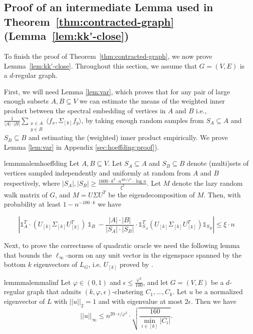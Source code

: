 \documentclass[letterpaper,11pt]{article}
\newcommand{\inner}[2]{\langle #1, #2 \rangle}
\theoremstyle{plain}
\theoremstyle{definition}
\theoremstyle{remark}
\newcommand{\e}{\epsilon}
\begin{document}
\subsection{Proof of an intermediate Lemma used in Theorem~\ref{thm:contracted-graph} (Lemma~\ref{lem:kk'-close})} \label{sec:quadproof}

To finish the proof of Theorem~\ref{thm:contracted-graph}, we now prove Lemma~\ref{lem:kk'-close}.
Throughout this section, we assume that $G=(V,E)$ is a $d$-regular graph. 


First, we will need Lemma \ref{lem:var}, which proves that for any pair of large enough subsets $A, B \subseteq V$
we can estimate the means of the weighted inner product between  the spectral embedding of vertices in $A$ and $B$
 i.e., $\frac{1}{|A|\cdot |B|} \sum_{\substack{x \in A\\y \in B}} \inner{f_x}{\Sigma_{[k]} f_y}$, by taking enough random samples from $S_A \subseteq A$ and $S_B \subseteq B$ and estimating the 
(weighted) inner product empirically. We prove Lemma \ref{lem:var} in Appendix \ref{sec:hoeffding:proof}).

\begin{restatable}{lemmma}{lemhoeffding} \label{lem:var}
	 Let $A,B\subseteq V$. Let $S_A \subseteq A$ and $S_B \subseteq B$ denote (multi)sets of vertices sampled independently and uniformly at random from $A$ and $B$ respectively, where $|S_A|, |S_B| \geq  \frac{1600\cdot k^3\cdot n^{40 \epsilon/\varphi^2}\cdot \log n}{\xi^2}$. Let $M$ denote the lazy random walk matrix of $G$, and $M=U\Sigma U^T$ be the eigendecomposition of $M$.  Then, with probability at least $1 - n^{-100\cdot k}$ we have 

	\begin{equation} \label{eq:apx-dp}
		\left| \mathds{1}_A^T \cdot (U_{[k]}\Sigma_{[k]}U_{[k]}^T) \ 
		\mathds{1}_B \ 
		- \frac{|A|\cdot |B|}{|S_A|\cdot |S_B|}\cdot \mathds{1}_{S_A}^T (U_{[k]}\Sigma_{[k]}U_{[k]}^T) \mathds{1}_{S_B} \right| \leq \xi\cdot n
	\end{equation}
\end{restatable}

Next, to prove the correctness of quadratic oracle we need the following lemma that bounds the $\ell_\infty$-norm on any unit vector in the eigenspace spanned by the bottom $k$ eigenvectors of $L_G$, i.e. $U_{[k]}$ proved by \cite{GluchKLMS21}.

\begin{restatable}[\cite{GluchKLMS21}]{lemmma}{lemmalinf}\label{lem:l-inf-bnd}
Let $\varphi\in(0,1)$ and $\epsilon \leq \frac{\varphi^2}{100}$, and let $G=(V,E)$ be a $d$-regular graph that admits $(k,\varphi,\e)$-clustering $C_1, \ldots, C_k$.  Let $u$ be a normalized eigenvector of $L$ with $||u||_2=1$ and with eigenvalue at most $2\epsilon$.     Then we have 
\[||u||_\infty \leq  n^{20\cdot\epsilon /\varphi^2}\cdot \sqrt{\frac{160}{\min_{i\in [k]}|C_i|}} \text{.} \]
\end{restatable}
\end{document}
